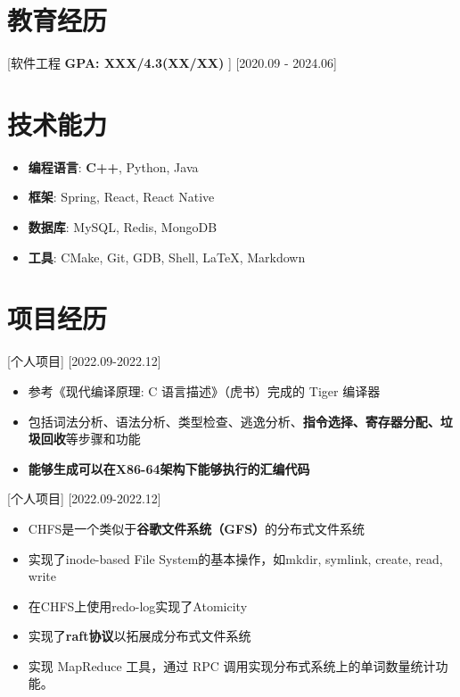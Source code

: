 \documentclass{resume}
\begin{document}

\ResumeTitle
\section{教育经历}
[\textnormal{软件工程 \qquad \textbf{GPA: XXX/4.3(XX/XX)}} ]
[2020.09 - 2024.06] 



\section{技术能力}
\begin{itemize}
  \item \textbf{编程语言}: \textbf{C++}, Python, Java 
  \item \textbf{框架}: Spring, React, React Native
  \item \textbf{数据库}: MySQL, Redis, MongoDB
  \item \textbf{工具}: CMake, Git, GDB, Shell, LaTeX, Markdown
\end{itemize}

\section{项目经历}
[个人项目]
[2022.09-2022.12] 
\begin{itemize}
    \item 参考《现代编译原理: C 语言描述》（虎书）完成的 Tiger 编译器
    \item 包括词法分析、语法分析、类型检查、逃逸分析、\textbf{指令选择、寄存器分配、垃圾回收}等步骤和功能
  \item \textbf{能够生成可以在X86-64架构下能够执行的汇编代码}
\end{itemize}

[个人项目]
[2022.09-2022.12] 
\begin{itemize}
  \item CHFS是一个类似于\textbf{谷歌文件系统（GFS）}的分布式文件系统
  \item 实现了inode-based File System的基本操作，如mkdir, symlink, create, read, write
  \item 在CHFS上使用redo-log实现了Atomicity
  \item 实现了\textbf{raft协议}以拓展成分布式文件系统
    \item 实现 MapReduce 工具，通过 RPC 调用实现分布式系统上的单词数量统计功能。
\end{itemize}
\end{document}
